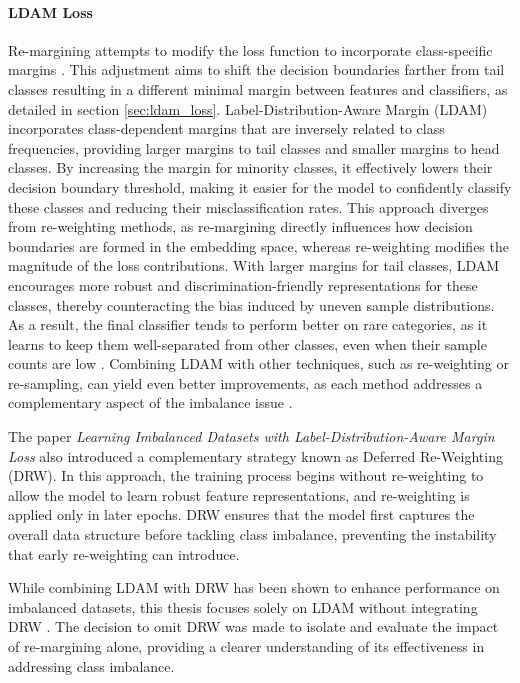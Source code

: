 \paragraph{LDAM Loss}
Re-margining attempts to modify the loss function to incorporate class-specific margins \cite{zhang2023deep}. This adjustment aims to shift the decision boundaries farther from tail classes resulting in a different minimal margin between features and classifiers, as detailed in section \ref{sec:ldam_loss}. Label-Distribution-Aware Margin (LDAM) \cite{cao2019learningimbalanceddatasetslabeldistributionaware} incorporates class-dependent margins that are inversely related to class frequencies, providing larger margins to tail classes and smaller margins to head classes. By increasing the margin for minority classes, it effectively lowers their decision boundary threshold, making it easier for the model to confidently classify these classes and reducing their misclassification rates. This approach diverges from re-weighting methods, as re-margining directly influences how decision boundaries are formed in the embedding space, whereas re-weighting modifies the magnitude of the loss contributions. With larger margins for tail classes, LDAM encourages more robust and discrimination-friendly representations for these classes, thereby counteracting the bias induced by uneven sample distributions. As a result, the final classifier tends to perform better on rare categories, as it learns to keep them well-separated from other classes, even when their sample counts are low \cite{cao2019learningimbalanceddatasetslabeldistributionaware}. Combining LDAM with other techniques, such as re-weighting or re-sampling, can yield even better improvements, as each method addresses a complementary aspect of the imbalance issue \cite{cao2019learningimbalanceddatasetslabeldistributionaware}. 

The paper \emph{Learning Imbalanced Datasets with Label-Distribution-Aware Margin Loss} also introduced a complementary strategy known as Deferred Re-Weighting (DRW). In this approach, the training process begins without re-weighting to allow the model to learn robust feature representations, and re-weighting is applied only in later epochs. DRW ensures that the model first captures the overall data structure before tackling class imbalance, preventing the instability that early re-weighting can introduce.

While combining LDAM with DRW has been shown to enhance performance on imbalanced datasets, this thesis focuses solely on LDAM without integrating DRW \cite{cao2019learningimbalanceddatasetslabeldistributionaware}. The decision to omit DRW was made to isolate and evaluate the impact of re-margining alone, providing a clearer understanding of its effectiveness in addressing class imbalance.
\vspace{2em}

